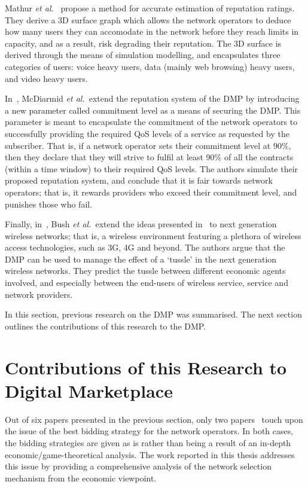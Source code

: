 Mathur \emph{et al.}~\cite{DMMathur02} propose a method for accurate estimation of reputation ratings. They derive a 3D surface graph which allows the network operators to deduce how many users they can accomodate in the network before they reach limits in capacity, and as a result, risk degrading their reputation. The 3D surface is derived through the means of simulation modelling, and encapsulates three categories of users: voice heavy users, data (mainly web browsing) heavy users, and video heavy users.

In~\cite{DMMcDiarmid06}, McDiarmid \emph{et al.}~extend the reputation system of the DMP by introducing a new parameter called commitment level as a means of securing the DMP. This parameter is meant to encapsulate the commitment of the network operators to successfully providing the required QoS levels of a service as requested by the subscriber. That is, if a network operator sets their commitment level at 90\%, then they declare that they will strive to fulfil at least 90\% of all the contracts (within a time window) to their required QoS levels. The authors simulate their proposed reputation system, and conclude that it is fair towards network operators; that is, it rewards providers who exceed their commitment level, and punishes those who fail.

Finally, in~\cite{DMBushTussle09}, Bush \emph{et al.}~extend the ideas presented in~\cite{DMIrvine02} to next generation wireless networks; that is, a wireless environment featuring a plethora of wireless access technologies, such as 3G, 4G and beyond. The authors argue that the DMP can be used to manage the effect of a `tussle' in the next generation wireless networks. They predict the tussle between different economic agents involved, and especially between the end-users of wireless service, service and network providers.

In this section, previous research on the DMP was summarised. The next section outlines the contributions of this research to the DMP.

\section{Contributions of this Research to Digital Marketplace} %
\label{sec:contributions_of_this_research_to_digital_marketplace_dmp}
Out of six papers presented in the previous section, only two papers~\cite{DMLeBodic00,DMIrvine01} touch upon the issue of the best bidding strategy for the network operators. In both cases, the bidding strategies are given as is rather than being a result of an in-depth economic/game-theoretical analysis. The work reported in this thesis addresses this issue by providing a comprehensive analysis of the network selection mechanism from the economic viewpoint.

